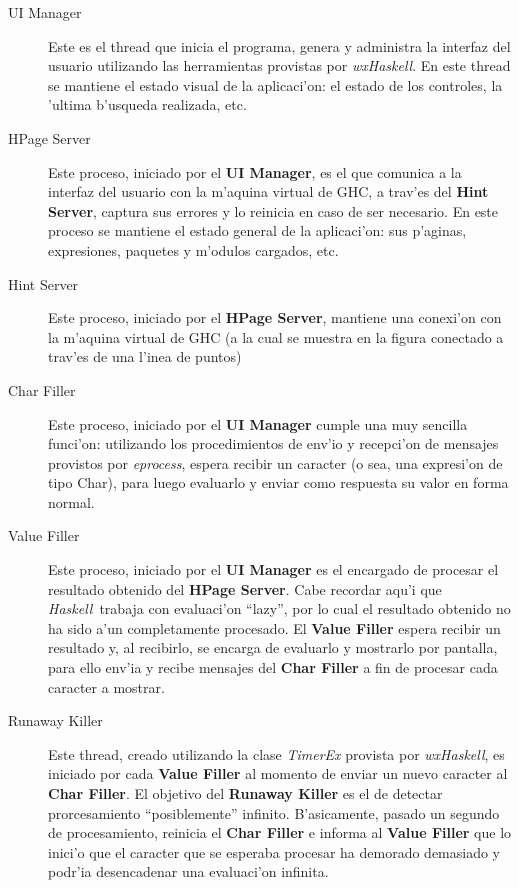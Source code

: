 \documentclass[a4paper]{article}
\newcommand{\haskell}{\textsl{Haskell}}
\begin{document}
\begin{description}
	\item[UI Manager] Este es el thread que inicia el programa, genera y administra la interfaz del usuario utilizando las herramientas provistas por \textsl{wxHaskell}.  En este thread se mantiene el estado visual de la aplicaci'on: el estado de los controles, la 'ultima b'usqueda realizada, etc.
	\item[HPage Server] Este proceso, iniciado por el \textbf{UI Manager}, es el que comunica a la interfaz del usuario con la m'aquina virtual de GHC, a trav'es del \textbf{Hint Server}, captura sus errores y lo reinicia en caso de ser necesario.  En este proceso se mantiene el estado general de la aplicaci'on: sus p'aginas, expresiones, paquetes y m'odulos cargados, etc.
	\item[Hint Server] Este proceso, iniciado por el \textbf{HPage Server}, mantiene una conexi'on con la m'aquina virtual de GHC (a la cual se muestra en la figura conectado a trav'es de una l'inea de puntos)
	\item[Char Filler] Este proceso, iniciado por el \textbf{UI Manager} cumple una muy sencilla funci'on: utilizando los procedimientos de env'io y recepci'on de mensajes provistos por \textsl{eprocess}, espera recibir un caracter (o sea, una expresi'on de tipo Char), para luego evaluarlo y enviar como respuesta su valor en forma normal.
	\item[Value Filler] Este proceso, iniciado por el \textbf{UI Manager} es el encargado de procesar el resultado obtenido del \textbf{HPage Server}.  Cabe recordar aqu'i que \haskell\ trabaja con evaluaci'on ``lazy'', por lo cual el resultado obtenido no ha sido a'un completamente procesado.  El \textbf{Value Filler} espera recibir un resultado y, al recibirlo, se encarga de evaluarlo y mostrarlo por pantalla, para ello env'ia y recibe mensajes del \textbf{Char Filler} a fin de procesar cada caracter a mostrar.
	\item[Runaway Killer] Este thread, creado utilizando la clase \textsl{TimerEx} provista por \textsl{wxHaskell}, es iniciado por cada \textbf{Value Filler} al momento de enviar un nuevo caracter al \textbf{Char Filler}.  El objetivo del \textbf{Runaway Killer} es el de detectar prorcesamiento ``posiblemente'' infinito.  B'asicamente, pasado un segundo de procesamiento, reinicia el \textbf{Char Filler} e informa al \textbf{Value Filler} que lo inici'o que el caracter que se esperaba procesar ha demorado demasiado y podr'ia desencadenar una evaluaci'on infinita.
\end{description}
\end{document}
